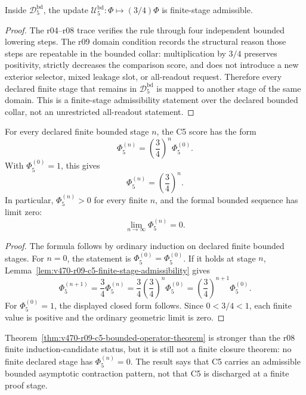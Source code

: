 \begin{lemma}
\label{lem:v470-r09-c5-finite-stage-admissibility}
Inside \(\mathcal D_5^{\mathrm{bd}}\), the update
\(\mathcal U_5^{\mathrm{bd}}:\Phi\mapsto(3/4)\Phi\) is finite-stage admissible.
\end{lemma}

\begin{proof}
The r04--r08 trace verifies the rule through four independent bounded lowering
steps.  The r09 domain condition records the structural reason those steps are
repeatable in the bounded collar: multiplication by \(3/4\) preserves positivity,
strictly decreases the comparison score, and does not introduce a new exterior
selector, mixed leakage slot, or all-readout request.  Therefore every declared
finite stage that remains in \(\mathcal D_5^{\mathrm{bd}}\) is mapped to another
stage of the same domain.  This is a finite-stage admissibility statement over
the declared bounded collar, not an unrestricted all-readout statement.
\end{proof}

\begin{theorem}
\label{thm:v470-r09-c5-bounded-operator-theorem}
For every declared finite bounded stage \(n\), the C5 score has the form
\[
\Phi_5^{(n)}=
\left(\frac34\right)^n\Phi_5^{(0)}.
\]
With \(\Phi_5^{(0)}=1\), this gives
\[
\Phi_5^{(n)}=\left(\frac34\right)^n.
\]
In particular, \(\Phi_5^{(n)}>0\) for every finite \(n\), and the formal bounded
sequence has limit zero:
\[
\lim_{n\to\infty}\Phi_5^{(n)}=0.
\]
\end{theorem}

\begin{proof}
The formula follows by ordinary induction on declared finite bounded stages.
For \(n=0\), the statement is \(\Phi_5^{(0)}=\Phi_5^{(0)}\).  If it holds at
stage \(n\), Lemma~\ref{lem:v470-r09-c5-finite-stage-admissibility} gives
\[
\Phi_5^{(n+1)}=\frac34\Phi_5^{(n)}=\frac34\left(\frac34\right)^n\Phi_5^{(0)}
=\left(\frac34\right)^{n+1}\Phi_5^{(0)}.
\]
For \(\Phi_5^{(0)}=1\), the displayed closed form follows.  Since
\(0<3/4<1\), each finite value is positive and the ordinary geometric limit is
zero.
\end{proof}

\begin{remark}
\label{rem:v470-r09-not-c5-closure}
Theorem~\ref{thm:v470-r09-c5-bounded-operator-theorem} is stronger than the r08
finite induction-candidate status, but it is still not a finite closure theorem:
no finite declared stage has \(\Phi_5^{(n)}=0\).  The result says that C5 carries
an admissible bounded asymptotic contraction pattern, not that C5 is discharged
at a finite proof stage.
\end{remark}

